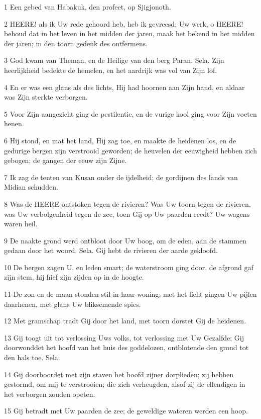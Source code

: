\par 1 Een gebed van Habakuk, den profeet, op Sjigjonoth.
\par 2 HEERE! als ik Uw rede gehoord heb, heb ik gevreesd; Uw werk, o HEERE! behoud dat in het leven in het midden der jaren, maak het bekend in het midden der jaren; in den toorn gedenk des ontfermens.
\par 3 God kwam van Theman, en de Heilige van den berg Paran. Sela. Zijn heerlijkheid bedekte de hemelen, en het aardrijk was vol van Zijn lof.
\par 4 En er was een glans als des lichts, Hij had hoornen aan Zijn hand, en aldaar was Zijn sterkte verborgen.
\par 5 Voor Zijn aangezicht ging de pestilentie, en de vurige kool ging voor Zijn voeten henen.
\par 6 Hij stond, en mat het land, Hij zag toe, en maakte de heidenen los, en de gedurige bergen zijn verstrooid geworden; de heuvelen der eeuwigheid hebben zich gebogen; de gangen der eeuw zijn Zijne.
\par 7 Ik zag de tenten van Kusan onder de ijdelheid; de gordijnen des lands van Midian schudden.
\par 8 Was de HEERE ontstoken tegen de rivieren? Was Uw toorn tegen de rivieren, was Uw verbolgenheid tegen de zee, toen Gij op Uw paarden reedt? Uw wagens waren heil.
\par 9 De naakte grond werd ontbloot door Uw boog, om de eden, aan de stammen gedaan door het woord. Sela. Gij hebt de rivieren der aarde gekloofd.
\par 10 De bergen zagen U, en leden smart; de waterstroom ging door, de afgrond gaf zijn stem, hij hief zijn zijden op in de hoogte.
\par 11 De zon en de maan stonden stil in haar woning; met het licht gingen Uw pijlen daarhenen, met glans Uw bliksemende spies.
\par 12 Met gramschap tradt Gij door het land, met toorn dorstet Gij de heidenen.
\par 13 Gij toogt uit tot verlossing Uws volks, tot verlossing met Uw Gezalfde; Gij doorwonddet het hoofd van het huis des goddelozen, ontblotende den grond tot den hals toe. Sela.
\par 14 Gij doorboordet met zijn staven het hoofd zijner dorplieden; zij hebben gestormd, om mij te verstrooien; die zich verheugden, alsof zij de ellendigen in het verborgen zouden opeten.
\par 15 Gij betradt met Uw paarden de zee; de geweldige wateren werden een hoop.
